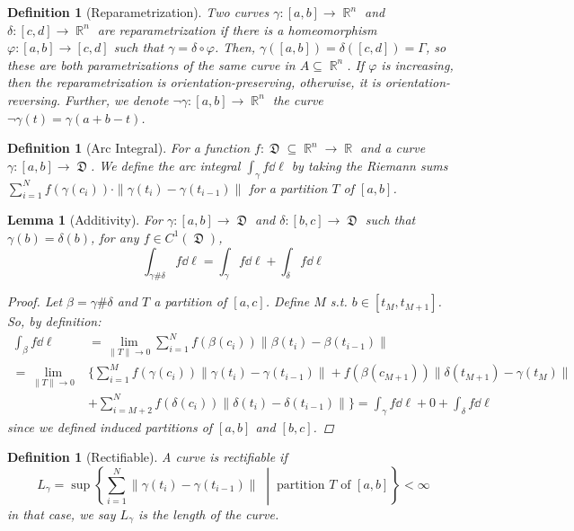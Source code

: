 \documentclass[12pt]{article}
\newcommand{\set}[2]{\left\{{#1}\;\middle|\;{#2}\right\}}
\DeclareMathOperator{\R}{\mathbb{R}}
\DeclareMathOperator{\D}{\mathfrak{D}}
\newtheorem{definition}[theorem]{Definition}
\newtheorem{lemma}[theorem]{Lemma}
\begin{document}
\begin{definition}[Reparametrization]
  Two curves $\gamma:[a,b]\to\R^n$ and $\delta:[c,d]\to\R^n$ are reparametrization if there is a homeomorphism $\varphi:[a,b]\to[c,d]$  such that $\gamma=\delta\circ\varphi$. Then, $\gamma([a,b])=\delta([c,d])=\Gamma$, so these are both parametrizations of the same curve in $A\subseteq\R^n$. If $\varphi$ is increasing, then the reparametrization is orientation-preserving, otherwise, it is orientation-reversing. Further, we denote $\neg\gamma:[a,b]\to\R^n$ the curve $\neg\gamma(t)=\gamma(a+b-t)$.
\end{definition}

\begin{definition}[Arc Integral]
  For a function $f:\D\subseteq\R^n\to\R$ and a curve $\gamma:[a,b]\to\D$. We define the arc integral $\displaystyle\int_{\gamma}f\dd{\ell}$ by taking the Riemann sums $\displaystyle\sum_{i=1}^N f(\gamma(c_i))\cdot\|\gamma(t_i)-\gamma(t_{i-1})\|$ for a partition $T$ of $[a,b]$.
\end{definition}

\begin{lemma}[Additivity]
  \label{line_additivity}
  For $\gamma:[a,b]\to\D$ and $\delta:[b,c]\to\D$ such that $\gamma(b)=\delta(b)$, for any $f\in C^1(\D)$, $$\int_{\gamma\#\delta} f\dd{\ell}=\int_{\gamma}f\dd{\ell}+\int_{\delta} f\dd{\ell}$$
  \begin{proof}
    Let $\beta=\gamma\#\delta$ and $T$ a partition of $[a,c]$. Define $M$ s.t. $b\in[t_M,t_{M+1}]$. So, by definition: 
    \begin{align*}
      \int_{\beta} f\dd{\ell}&=\lim_{\|T\|\to 0}\sum_{i=1}^N f(\beta(c_i))\|\beta(t_i)-\beta(t_{i-1})\|\\
      =\lim_{\|T\|\to 0}&\bigg\{\sum_{i=1}^{M} f(\gamma(c_i))\|\gamma(t_i)-\gamma(t_{i-1})\|+f(\beta(c_{M+1}))\|\delta(t_{M+1})-\gamma(t_M)\|\\
      &+\sum_{i=M+2}^{N} f(\delta(c_i))\|\delta(t_i)-\delta(t_{i-1})\|\bigg\}=\int_{\gamma} f\dd{\ell}+0+\int_{\delta} f\dd{\ell}
    \end{align*} since we defined induced partitions of $[a,b]$ and $[b,c]$.
  \end{proof}
\end{lemma}

\begin{definition}[Rectifiable]
  A curve is rectifiable if $$L_\gamma=\sup\set{\sum_{i=1}^N \|\gamma(t_i)-\gamma(t_{i-1})\|}{\text{partition }T\text{ of }[a,b]}<\infty$$ in that case, we say $L_\gamma$ is the length of the curve.
\end{definition}
\end{document}
